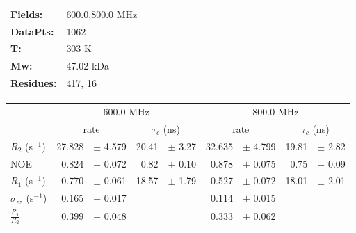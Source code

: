 \documentclass[showkeys,aps,prb,prepreint,amssymb, amsmath,nobibnotes]{article}
\begin{document}
\begin{tabular}{ll}
\textbf{Fields:} &  600.0,800.0 MHz\\
\textbf{DataPts:} &  1062\\
 \textbf{T:} & 303 K\\
\textbf{Mw:} & 47.02 kDa\\
\textbf{Residues: } &   417, 16\\
\end{tabular}

\begin{small}
\noindent \begin{tabular}{l|rlrl|rlrl}
& \multicolumn{4}{c}{600.0 MHz}& \multicolumn{4}{c}{800.0 MHz}\\
&  \multicolumn{2}{c}{rate} & \multicolumn{2}{c}{$\tau_c$ (ns)}   &  \multicolumn{2}{c}{rate} & \multicolumn{2}{c}{$\tau_c$ (ns)}   \\
\hline$R_2$  (s$^{-1}$)  &  27.828 & $\pm$ 4.579   &  20.41 & $\pm$ 3.27 &  32.635 & $\pm$ 4.799   &  19.81 & $\pm$ 2.82 \\
NOE  &  0.824 & $\pm$ 0.072   &  0.82 & $\pm$ 0.10 &  0.878 & $\pm$ 0.075   &  0.75 & $\pm$ 0.09 \\
$R_1$ (s$^{-1}$)  &  0.770 & $\pm$ 0.061   &  18.57 & $\pm$ 1.79 &  0.527 & $\pm$ 0.072   &  18.01 & $\pm$ 2.01 \\
$\sigma_{zz}$  (s$^{-1}$)  &  0.165 & $\pm$ 0.017   & & &  0.114 & $\pm$ 0.015   & & \\
$\frac{R_1}{R_2}$  &  0.399 & $\pm$ 0.048   & & &  0.333 & $\pm$ 0.062   & & \\
\end{tabular}
\end{small}
\end{document}
